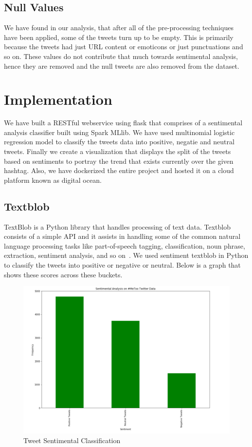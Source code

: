 \subsection{Null Values}
We have found in our analysis, that after all of the pre-processing techniques have been 
applied, some of the tweets turn up to be empty. This is primarily because the tweets had just 
URL content or emoticons or just punctuations and so on. These values do not contribute that 
much towards sentimental analysis, hence they are removed and the null tweets are also 
removed from the dataset.

\section{Implementation}
We have built a RESTful webservice using flask that comprises of a sentimental analysis 
classifier built using Spark MLlib. We have used multinomial logistic regression model 
to classify the tweets data into positive, negatie and neutral tweets. Finally we create a 
visualization that displays the split of the tweets based on sentiments to portray the 
trend that exists currently over the given hashtag. Also, we have dockerized the entire project and 
hosted it on a cloud platform known as digital ocean. 

\subsection{Textblob}
TextBlob is a Python library that handles processing of text data. 
Textblob consists of a simple API and it assists in handling some of the common 
natural language processing tasks like part-of-speech tagging, classification, 
noun phrase, extraction, sentiment analysis, and so on~\cite{hid-sp18-418-textblob}.
We used sentiment textblob in Python to classify the tweets into positive or 
negative or neutral. Below is a graph that shows these scores across these 
buckets. \\

\begin{figure}[!ht]
\centering\includegraphics[width=\columnwidth]{images/text.png}
\caption{Tweet Sentimental Classification}
\label{f:Sentimental Analysis}
\end{figure}

